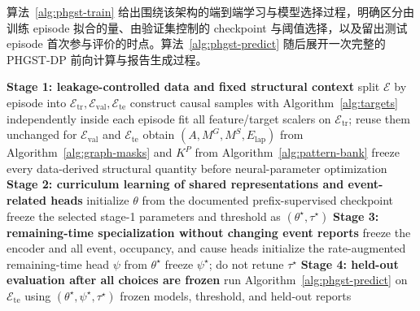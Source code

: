 \documentclass[a4paper,fleqn]{cas-dc}
\newcommand{\zhpara}[1]{%
  \par\begingroup\small\color{black!72}\noindent #1\par\endgroup}
\begin{document}
\zhpara{算法~\ref{alg:phgst-train} 给出围绕该架构的端到端学习与模型选择过程，明确区分由训练 episode 拟合的量、由验证集控制的 checkpoint 与阈值选择，以及留出测试 episode 首次参与评价的时点。算法~\ref{alg:phgst-predict} 随后展开一次完整的 PHGST-DP 前向计算与报告生成过程。}

\begin{algorithm*}[t]
\SetAlFnt{\small}
\SetAlCapFnt{\small}
\SetAlCapNameFnt{\small\bfseries}
\SetInd{0.6em}{1.0em}
\caption{End-to-end PHGST-DP training, selection, and held-out evaluation.}
\label{alg:phgst-train}
\BlankLine
\textbf{Stage 1: leakage-controlled data and fixed structural context}\;
split $\mathcal{E}$ by episode into $\mathcal{E}_{\mathrm{tr}},\mathcal{E}_{\mathrm{val}},\mathcal{E}_{\mathrm{te}}$\;
construct causal samples with Algorithm~\ref{alg:targets} independently inside each episode\;
fit all feature/target scalers on $\mathcal{E}_{\mathrm{tr}}$; reuse them unchanged for $\mathcal{E}_{\mathrm{val}}$ and $\mathcal{E}_{\mathrm{te}}$\;
obtain $(A,M^{G},M^{S},E_{\mathrm{lap}})$ from Algorithm~\ref{alg:graph-masks} and $K^{P}$ from Algorithm~\ref{alg:pattern-bank}\;
freeze every data-derived structural quantity before neural-parameter optimization 
\BlankLine
\textbf{Stage 2: curriculum learning of shared representations and event-related heads}\;
initialize $\theta$ from the documented prefix-supervised checkpoint\;
freeze the selected stage-1 parameters and threshold as $(\theta^{\star},\tau^{\star})$ 
\BlankLine
\textbf{Stage 3: remaining-time specialization without changing event reports}\;
freeze the encoder and all event, occupancy, and cause heads\;
initialize the rate-augmented remaining-time head $\psi$ from $\theta^{\star}$\;
freeze $\psi^{\star}$; do not retune $\tau^{\star}$\;
\BlankLine
\textbf{Stage 4: held-out evaluation after all choices are frozen}\;
run Algorithm~\ref{alg:phgst-predict} on $\mathcal{E}_{\mathrm{te}}$ using $(\theta^{\star},\psi^{\star},\tau^{\star})$\;
\Return frozen models, threshold, and held-out reports 
\end{algorithm*}
\end{document}
